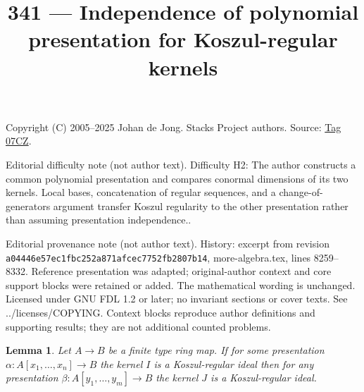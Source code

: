 \documentclass{amsart}
\theoremstyle{plain}
\newtheorem{lemma}[subsection]{Lemma}
\theoremstyle{definition}
\theoremstyle{remark}
\numberwithin{equation}{subsection}
\begin{document}
\title[Stacks Project, Tag 07CZ]{341 --- Independence of polynomial presentation for Koszul-regular kernels}
\maketitle
\noindent Copyright (C) 2005--2025 Johan de Jong. Stacks Project authors. Source: \href{https://stacks.math.columbia.edu/tag/07CZ}{Tag 07CZ}.

\noindent Editorial difficulty note (not author text). Difficulty H2: The author constructs a common polynomial presentation and compares conormal dimensions of its two kernels. Local bases, concatenation of regular sequences, and a change-of-generators argument transfer Koszul regularity to the other presentation rather than assuming presentation independence..

\noindent Editorial provenance note (not author text). History: excerpt from revision \texttt{a0444\allowbreak 6e57e\allowbreak c1fbc\allowbreak 252a8\allowbreak 71afc\allowbreak ec775\allowbreak 2fb28\allowbreak 07b14}, more-algebra.tex, lines 8259--8332. Reference presentation was adapted; original-author context and core support blocks were retained or added. The mathematical wording is unchanged. Licensed under GNU FDL 1.2 or later; no invariant sections or cover texts. See ../licenses/COPYING. Context blocks reproduce author definitions and supporting results; they are not additional counted problems.

\begin{lemma}
\label{lemma-koszul-independence-presentation}
Let $A \to B$ be a finite type ring map. If for some presentation
$\alpha : A[x_1, \ldots, x_n] \to B$ the kernel $I$ is a Koszul-regular ideal
then for any presentation $\beta : A[y_1, \ldots, y_m] \to B$ the kernel
$J$ is a Koszul-regular ideal.
\end{lemma}
\end{document}
